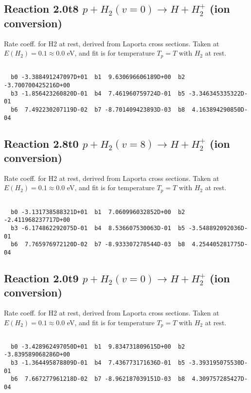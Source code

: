 \documentclass[12pt,dvipdfmx]{article}
\begin{document}
\newpage
\subsection{
Reaction 2.0t8
$ p + H_2(v=0) \rightarrow H + H_2^+$ (ion conversion)
}
Rate coeff. for H2 at rest, derived from Laporta cross sections.
Taken at $E(H_2) = 0.1 \approx 0.0$ eV,  and fit is for temperature $T_p=T$ with $H_2$ at rest.

\begin{small}\begin{verbatim}

  b0 -3.388491247097D+01  b1  9.630696606189D+00  b2 -3.700700425216D+00
  b3 -1.856423260820D-01  b4  7.461960759724D-01  b5 -3.346345335322D-01
  b6  7.492230207119D-02  b7 -8.701409423893D-03  b8  4.163894290850D-04

\end{verbatim}\end{small}

\newpage
\subsection{
Reaction 2.8t0
$ p + H_2(v=8) \rightarrow H + H_2^+$ (ion conversion)
}
Rate coeff. for H2 at rest, derived from Laporta cross sections.
Taken at $E(H_2) = 0.1 \approx 0.0$ eV,  and fit is for temperature $T_p=T$ with $H_2$ at rest.

\begin{small}\begin{verbatim}

  b0 -3.131738588321D+01  b1  7.060996032852D+00  b2 -2.411968237717D+00
  b3 -6.174862292075D-01  b4  8.536607530063D-01  b5 -3.548892092036D-01
  b6  7.765976972120D-02  b7 -8.933307278544D-03  b8  4.254405281775D-04

\end{verbatim}\end{small}

\newpage
\subsection{
Reaction 2.0t9
$ p + H_2(v=0) \rightarrow H + H_2^+$ (ion conversion)
}
Rate coeff. for H2 at rest, derived from Laporta cross sections.
Taken at $E(H_2) = 0.1 \approx 0.0$ eV,  and fit is for temperature $T_p=T$ with $H_2$ at rest.

\begin{small}\begin{verbatim}

  b0 -3.428962497050D+01  b1  9.834731809615D+00  b2 -3.839589068286D+00
  b3 -1.364495878809D-01  b4  7.436773171636D-01  b5 -3.393195075530D-01
  b6  7.667277961218D-02  b7 -8.962187039151D-03  b8  4.309757285427D-04

\end{verbatim}\end{small}
\end{document}
